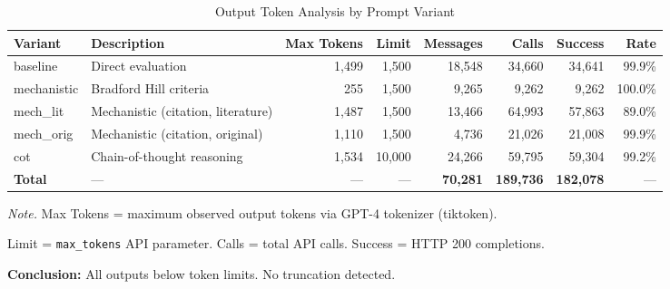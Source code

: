\begin{table}[H]
\centering
\caption{Output Token Analysis by Prompt Variant}
\label{tab:token_analysis}
\footnotesize
\begin{tabular}{@{}llrrrrrr@{}}
\toprule
\textbf{Variant} & \textbf{Description} & \textbf{Max Tokens} & \textbf{Limit} & \textbf{Messages} & \textbf{Calls} & \textbf{Success} & \textbf{Rate} \\
\midrule
baseline & Direct evaluation & 1,499 & 1,500 & 18,548 & 34,660 & 34,641 & 99.9\% \\
mechanistic & Bradford Hill criteria & 255 & 1,500 & 9,265 & 9,262 & 9,262 & 100.0\% \\
mech_lit & Mechanistic (citation, literature) & 1,487 & 1,500 & 13,466 & 64,993 & 57,863 & 89.0\% \\
mech_orig & Mechanistic (citation, original) & 1,110 & 1,500 & 4,736 & 21,026 & 21,008 & 99.9\% \\
cot & Chain-of-thought reasoning & 1,534 & 10,000 & 24,266 & 59,795 & 59,304 & 99.2\% \\
\midrule
\textbf{Total} & --- & --- & --- & \textbf{70,281} & \textbf{189,736} & \textbf{182,078} & --- \\
\bottomrule
\end{tabular}
\begin{tablenotes}
\small
\item \textit{Note.} Max Tokens = maximum observed output tokens via GPT-4 tokenizer (tiktoken).
\item Limit = \texttt{max\_tokens} API parameter. Calls = total API calls. Success = HTTP 200 completions.
\item \textbf{Conclusion:} All outputs below token limits. No truncation detected.
\end{tablenotes}
\end{table}